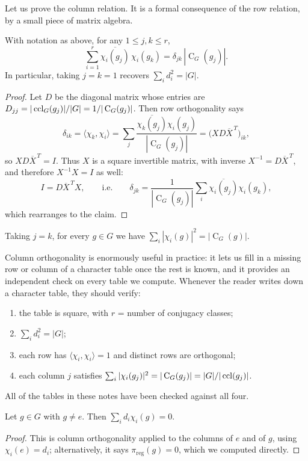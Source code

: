 \documentclass[a4paper]{scrartcl}
\newcommand{\Cent}{\operatorname{C}}
\newcommand{\ip}[2]{\langle #1, #2 \rangle}
\begin{document}
Let us prove the column relation. It is a formal consequence of the row relation, by a small piece of matrix algebra.

\begin{theorem}
	With notation as above, for any $1 \leq j, k \leq r$,
	$$\sum_{i=1}^r \overline{\chi_i(g_j)}\,\chi_i(g_k) = \delta_{jk}\,|\Cent_G(g_j)|.$$
	In particular, taking $j = k = 1$ recovers $\sum_i d_i^2 = |G|$.
\end{theorem}
\begin{proof}
	Let $D$ be the diagonal matrix whose entries are $D_{jj} = |\ccl_G(g_j)|/|G| = 1/|\Cent_G(g_j)|$. Then row orthogonality says
	$$\delta_{ik} = \ip{\chi_k}{\chi_i} = \sum_j \frac{\overline{\chi_k(g_j)}\chi_i(g_j)}{|\Cent_G(g_j)|} = \big(X D \overline{X}^{\,T}\big)_{ik},$$
	so $X D \overline X^{\,T} = I$. Thus $X$ is a square invertible matrix, with inverse $X^{-1} = D\overline X^{\,T}$, and therefore $X^{-1}X = I$ as well:
	$$I = D\overline X^{\,T} X, \qquad \text{i.e.}\qquad \delta_{jk} = \frac{1}{|\Cent_G(g_j)|}\sum_i \overline{\chi_i(g_j)}\chi_i(g_k),$$
	which rearranges to the claim.
\end{proof}

\begin{corollary}
	Taking $j = k$, for every $g \in G$ we have $\sum_i |\chi_i(g)|^2 = |\Cent_G(g)|$.
\end{corollary}

Column orthogonality is enormously useful in practice: it lets us fill in a missing row or column of a character table once the rest is known, and it provides an independent check on every table we compute. Whenever the reader writes down a character table, they should verify:
\begin{enumerate}[label=(\roman*)]
	\item the table is square, with $r$ = number of conjugacy classes;
	\item $\sum_i d_i^2 = |G|$;
	\item each row has $\ip{\chi_i}{\chi_i} = 1$ and distinct rows are orthogonal;
	\item each column $j$ satisfies $\sum_i|\chi_i(g_j)|^2 = |\Cent_G(g_j)| = |G|/|\ccl(g_j)|$.
\end{enumerate}
All of the tables in these notes have been checked against all four.

\begin{corollary}
	Let $g \in G$ with $g \neq e$. Then $\sum_i d_i \chi_i(g) = 0$.
\end{corollary}
\begin{proof}
	This is column orthogonality applied to the columns of $e$ and of $g$, using $\chi_i(e) = d_i$; alternatively, it says $\pi_{\text{reg}}(g) = 0$, which we computed directly.
\end{proof}
\end{document}

